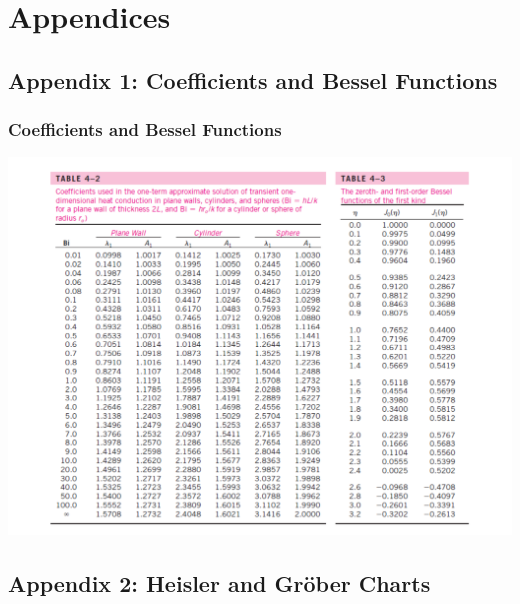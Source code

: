 \documentclass[10pt,compress]{beamer}
\begin{document}
\section{Appendices}

\subsection{Appendix 1: Coefficients and Bessel Functions}\label{appendix1}
\begin{frame}
 \frametitle{Coefficients and Bessel Functions}
        \begin{center}
          \includegraphics[width=.9\columnwidth,height=.65\columnwidth,clip]{./Pics/BaselFunctionTable}
        \end{center}
\end{frame}




\subsection{Appendix 2: Heisler and Gr\"ober Charts}\label{appendix2}
{
  
}
\end{document}
